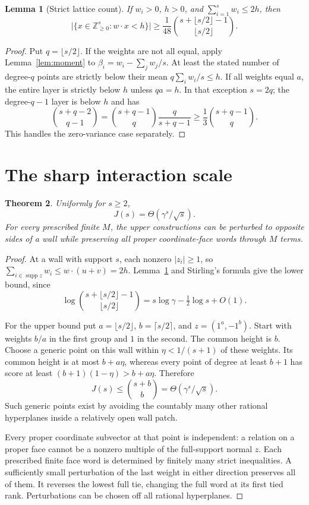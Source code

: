 \documentclass[11pt,a4paper]{article}
\newtheorem{theorem}{Theorem}
\newtheorem{lemma}[theorem]{Lemma}
\theoremstyle{remark}\newtheorem{remark}[theorem]{Remark}
\newcommand{\NN}{\mathbb Z_{\geq0}}
\newcommand{\supp}{\operatorname{supp}}
\newcommand{\card}[1]{\lvert#1\rvert}
\newcommand{\fl}[1]{\lfloor#1\rfloor}
\newcommand{\ce}[1]{\lceil#1\rceil}
\newcommand{\ga}{\gamma}
\begin{document}
\begin{lemma}[Strict lattice count]\label{lem:count}
If \(w_i>0\), \(h>0\), and \(\sum_{i=1}^s w_i\leq2h\), then
\[
 \card{\{x\in\NN^s:w\cdot x<h\}}
 \geq \frac1{48}\binom{s+\fl{s/2}-1}{\fl{s/2}}.
\]
\end{lemma}
\begin{proof}
Put \(q=\fl{s/2}\). If the weights are not all equal, apply
Lemma~\ref{lem:moment} to
\(\beta_i=w_i-\sum_jw_j/s\). At least the stated number
of degree-\(q\) points are strictly below their mean
\(q\sum_iw_i/s\leq h\).
If all weights equal \(a\), the entire layer is strictly
below \(h\) unless \(qa=h\). In that exception \(s=2q\);
the degree-\(q-1\) layer is below \(h\) and has
\[
 \binom{s+q-2}{q-1}
 =\binom{s+q-1}{q}\frac q{s+q-1}
 \geq\frac13\binom{s+q-1}{q}.
\]
This handles the zero-variance case separately.
\end{proof}

\section{The sharp interaction scale}
\begin{theorem}\label{thm:J}
Uniformly for \(s\geq2\),
\[
 J(s)=\Theta(\ga^s/\sqrt{s}).
\]
For every prescribed finite \(M\), the upper constructions can be
perturbed to opposite sides of a wall while preserving all proper
coordinate-face words through \(M\) terms.
\end{theorem}
\begin{proof}
At a wall with support \(s\), each nonzero \(|z_i|\geq1\), so
\(\sum_{i\in\supp z}w_i\leq w\cdot(u+v)=2h\).
Lemma~\ref{lem:count} and Stirling's formula give the lower bound,
since
\[
 \log\binom{s+\fl{s/2}-1}{\fl{s/2}}
   =s\log\ga-\tfrac12\log s+O(1).
\]

For the upper bound put \(a=\fl{s/2}\), \(b=\ce{s/2}\),
and \(z=(1^a,-1^b)\). Start with weights \(b/a\) in the
first group and \(1\) in the second. The common height is \(b\).
Choose a generic point on this wall within
\(\eta<1/(s+1)\) of these weights. Its common height is at most
\(b+a\eta\), whereas every point of degree at least \(b+1\)
has score at least
\((b+1)(1-\eta)>b+a\eta\).
Therefore
\[
 J(s)\leq\binom{s+b}{b}=\Theta(\ga^s/\sqrt{s}).
\]
Such generic points exist by avoiding the countably many
other rational hyperplanes inside a relatively open wall patch.

Every proper coordinate subvector at that point is independent:
a relation on a proper face cannot be a nonzero multiple of
the full-support normal \(z\). Each prescribed finite face word
is determined by finitely many strict inequalities. A sufficiently
small perturbation of the last weight in either direction preserves
all of them. It reverses the lowest full tie, changing the full word
at its first tied rank. Perturbations can be chosen off all rational
hyperplanes.
\end{proof}
\end{document}

